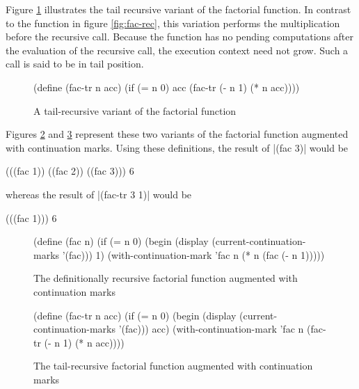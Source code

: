 Figure \ref{fig:fac-tail-rec} illustrates the tail recursive variant of the factorial
function. In contrast to the function in figure \ref{fig:fac-rec}, this variation performs
the multiplication before the recursive call. Because the function has no pending
computations after the evaluation of the recursive call, the execution context need not
grow. Such a call is said to be in tail position.

\begin{figure}
\begin{schemeblock}
\begin{schemedisplay}
(define (fac-tr n acc)
  (if (= n 0)
      acc
      (fac-tr (- n 1) (* n acc))))
\end{schemedisplay}
\end{schemeblock}
\caption{A tail-recursive variant of the factorial function}
\label{fig:fac-tail-rec}
\end{figure}

Figures \ref{fig:fac-rec-cm} and \ref{fig:fac-tail-rec-cm} represent these two variants of the
factorial function augmented with continuation marks. Using these definitions, the 
result of \scheme|(fac 3)| would be
\begin{schemeblock}
\begin{schemedisplay}
(((fac 1)) ((fac 2)) ((fac 3)))
6
\end{schemedisplay}
\end{schemeblock}
whereas the result of \scheme|(fac-tr 3 1)| would be
\begin{schemeblock}
\begin{schemedisplay}
(((fac 1)))
6
\end{schemedisplay}
\end{schemeblock}

\begin{figure}
\begin{schemeblock}
\begin{schemedisplay}
(define (fac n)
  (if (= n 0)
      (begin
        (display (current-continuation-marks '(fac)))
        1)
      (with-continuation-mark 'fac n (* n (fac (- n 1)))))
\end{schemedisplay}
\end{schemeblock}
\caption{The definitionally recursive factorial function augmented with continuation marks}
\label{fig:fac-rec-cm}
\end{figure}

\begin{figure}
\begin{schemeblock}
\begin{schemedisplay}
(define (fac-tr n acc)
  (if (= n 0)
      (begin
        (display (current-continuation-marks '(fac)))
        acc)
      (with-continuation-mark 'fac n (fac-tr (- n 1) (* n acc))))
\end{schemedisplay}
\end{schemeblock}
\caption{The tail-recursive factorial function augmented with continuation marks}
\label{fig:fac-tail-rec-cm}
\end{figure}

